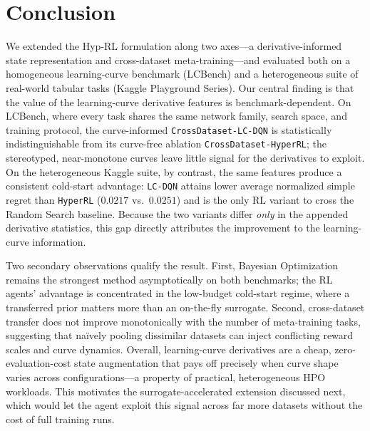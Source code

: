 \section{Conclusion}
\label{section:conclusion}

We extended the Hyp-RL formulation along two axes---a derivative-informed state representation and cross-dataset meta-training---and evaluated both on a homogeneous learning-curve benchmark (LCBench) and a heterogeneous suite of real-world tabular tasks (Kaggle Playground Series). Our central finding is that the value of the learning-curve derivative features is benchmark-dependent. On LCBench, where every task shares the same network family, search space, and training protocol, the curve-informed \texttt{CrossDataset-LC-DQN} is statistically indistinguishable from its curve-free ablation \texttt{CrossDataset-HyperRL}; the stereotyped, near-monotone curves leave little signal for the derivatives to exploit. On the heterogeneous Kaggle suite, by contrast, the same features produce a consistent cold-start advantage: \texttt{LC-DQN} attains lower average normalized simple regret than \texttt{HyperRL} ($0.0217$ vs.\ $0.0251$) and is the only RL variant to cross the Random Search baseline. Because the two variants differ \emph{only} in the appended derivative statistics, this gap directly attributes the improvement to the learning-curve information.

Two secondary observations qualify the result. First, Bayesian Optimization remains the strongest method asymptotically on both benchmarks; the RL agents' advantage is concentrated in the low-budget cold-start regime, where a transferred prior matters more than an on-the-fly surrogate. Second, cross-dataset transfer does not improve monotonically with the number of meta-training tasks, suggesting that na\"ively pooling dissimilar datasets can inject conflicting reward scales and curve dynamics. Overall, learning-curve derivatives are a cheap, zero-evaluation-cost state augmentation that pays off precisely when curve shape varies across configurations---a property of practical, heterogeneous HPO workloads. This motivates the surrogate-accelerated extension discussed next, which would let the agent exploit this signal across far more datasets without the cost of full training runs.
